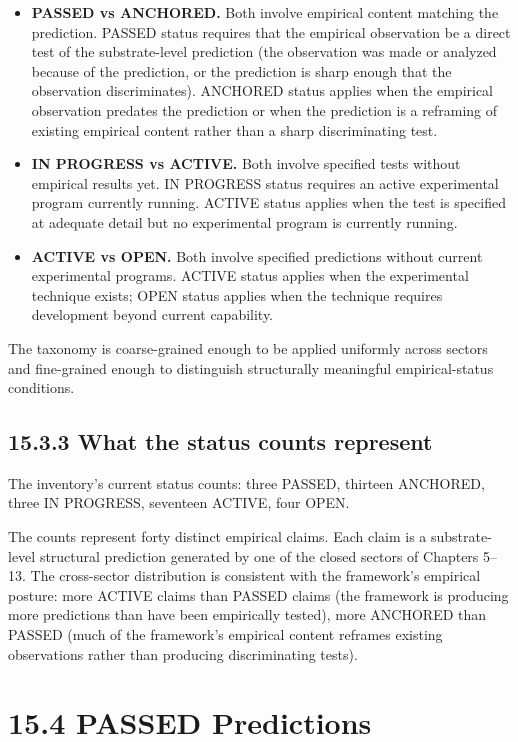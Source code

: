\documentclass[11pt]{book}
\begin{document}
\begin{itemize}
\item \textbf{PASSED vs ANCHORED.} Both involve empirical content matching the prediction. PASSED status requires that the empirical observation be a direct test of the substrate-level prediction (the observation was made or analyzed because of the prediction, or the prediction is sharp enough that the observation discriminates). ANCHORED status applies when the empirical observation predates the prediction or when the prediction is a reframing of existing empirical content rather than a sharp discriminating test.
\item \textbf{IN PROGRESS vs ACTIVE.} Both involve specified tests without empirical results yet. IN PROGRESS status requires an active experimental program currently running. ACTIVE status applies when the test is specified at adequate detail but no experimental program is currently running.
\item \textbf{ACTIVE vs OPEN.} Both involve specified predictions without current experimental programs. ACTIVE status applies when the experimental technique exists; OPEN status applies when the technique requires development beyond current capability.
\end{itemize}

The taxonomy is coarse-grained enough to be applied uniformly across sectors and fine-grained enough to distinguish structurally meaningful empirical-status conditions.

\subsection{15.3.3 What the status counts represent}

The inventory's current status counts: three PASSED, thirteen ANCHORED, three IN PROGRESS, seventeen ACTIVE, four OPEN.

The counts represent forty distinct empirical claims. Each claim is a substrate-level structural prediction generated by one of the closed sectors of Chapters 5–13. The cross-sector distribution is consistent with the framework's empirical posture: more ACTIVE claims than PASSED claims (the framework is producing more predictions than have been empirically tested), more ANCHORED than PASSED (much of the framework's empirical content reframes existing observations rather than producing discriminating tests).

\section{15.4 PASSED Predictions}
\end{document}
